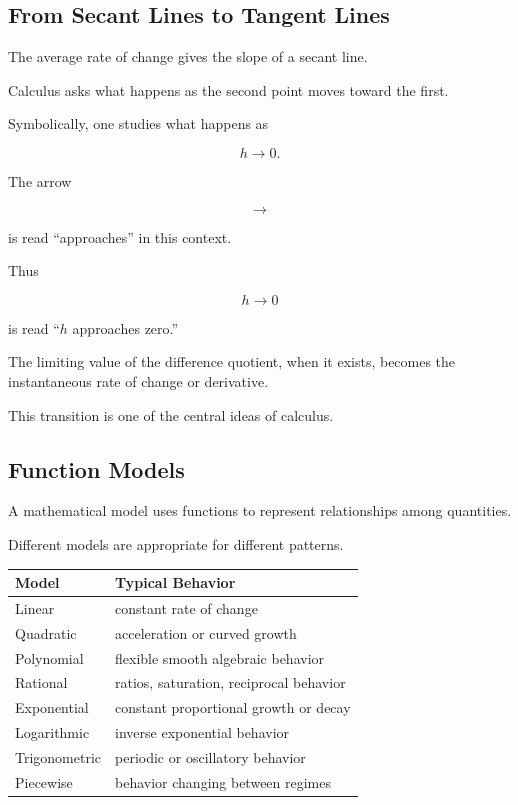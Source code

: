 \subsection{From Secant Lines to Tangent Lines}
\label{subsec:secant-to-tangent}

The average rate of change gives the slope of a secant line.

Calculus asks what happens as the second point moves toward the first.

Symbolically, one studies what happens as

\[ h\to0. \]

The arrow

\[ \to \]

is read ``approaches'' in this context.

Thus

\[ h\to0 \]

is read ``\(h\) approaches zero.''

The limiting value of the difference quotient, when it exists, becomes the
instantaneous rate of change or derivative.

This transition is one of the central ideas of calculus.

\subsection{Function Models}
\label{subsec:function-models}

A mathematical model uses functions to represent relationships among
quantities.

Different models are appropriate for different patterns.

\begin{center}
\begin{tabularx}{0.92\textwidth}{@{}lX@{}}
\toprule
\textbf{Model} & \textbf{Typical Behavior}\\
\midrule
Linear & constant rate of change\\
Quadratic & acceleration or curved growth\\
Polynomial & flexible smooth algebraic behavior\\
Rational & ratios, saturation, reciprocal behavior\\
Exponential & constant proportional growth or decay\\
Logarithmic & inverse exponential behavior\\
Trigonometric & periodic or oscillatory behavior\\
Piecewise & behavior changing between regimes\\
\bottomrule
\end{tabularx}
\end{center}

